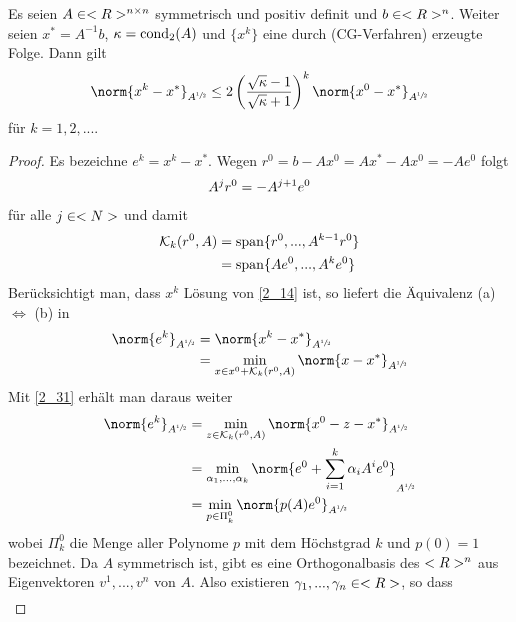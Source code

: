 \begin{proposition}
	Es seien $A\in<R>^{n \times n}$ symmetrisch und positiv definit und $b\in<R>^n$. Weiter seien $x^\ast=A^{-1}b$, $\kappa=\operatorname{cond}_2(A)$ und $\{x^k\}$ eine durch  (CG-Verfahren) erzeugte Folge. Dann gilt
	\begin{align}
		\norm{x^k-x^\ast}_{A^{\sfrac{1}{2}}} \le 2\left(\frac{\sqrt{\kappa} - 1}{\sqrt{\kappa} + 1}\right)^k\norm{x^0 - x^\ast}_{A^{\sfrac{1}{2}}}\notag
	\end{align}
	für $k=1,2,...$.
\end{proposition}
\begin{proof}
	Es bezeichne $e^k=x^k-x^\ast$. Wegen $r^0=b-Ax^0=Ax^\ast-Ax^0=-Ae^0$ folgt
	\begin{align}
		A^jr^0 = -A^{j+1}e^0\notag
	\end{align}
	für alle $j\in<N>$ und damit
	\begin{align}
		\label{2_31}
		\begin{split}
			\mathcal{K}_k(r^0,A) &= \operatorname{span}\{r^0,...,A^{k-1}r^0\} \\
			&= \operatorname{span}\{Ae^0,...,A^ke^0\}
		\end{split}
	\end{align}
	Berücksichtigt man, dass $x^k$ Lösung von \cref{2_14} ist, so liefert die Äquivalenz (a) $\Leftrightarrow$ (b) in 
	\begin{align}
		\norm{e^k}_{A^{\sfrac{1}{2}}} &= \norm{x^k-x^\ast}_{A^{\sfrac{1}{2}}} \notag \\
		&= \min_{x\in x^0+\mathcal{K}_k(r^0,A)}\norm{x-x^\ast}_{A^{\sfrac{1}{2}}} \notag 
	\end{align}
	Mit \cref{2_31} erhält man daraus weiter
	\begin{align}
		\label{2_32}
		\begin{split}
		\norm{e^k}_{A^{\sfrac{1}{2}}} &= \min_{z\in\mathcal{K}_k(r^0,A)}\norm{x^0-z-x^\ast}_{A^{\sfrac{1}{2}}} \\
		&= \min_{\alpha_1,...,\alpha_k}\norm{e^0+\sum_{i=1}^k \alpha_iA^ie^0}_{A^{\sfrac{1}{2}}} \\
		&= \min_{p\in\Pi^0_k} \norm{p(A)e^0}_{A^{\sfrac{1}{2}}}
		\end{split}
	\end{align}
	wobei $\Pi_k^0$ die Menge aller Polynome $p$ mit dem Höchstgrad $k$ und $p(0)=1$ bezeichnet. Da $A$ symmetrisch ist, gibt es eine Orthogonalbasis des $<R>^n$ aus Eigenvektoren $v^1,...,v^n$ von $A$. Also existieren $\gamma_1,...,\gamma_n\in<R>$, so dass
	\begin{align}

\end{align}
\end{proof}
